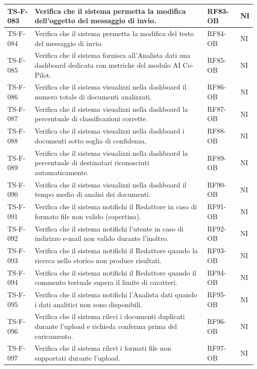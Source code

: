 \documentclass[a4paper,12pt]{article}
\begin{document}
\begin{longtable}{|p{2.2cm}|p{9.5cm}|p{2.3cm}|p{1.5cm}|}
    TS-F-083 & Verifica che il sistema permetta la modifica dell'oggetto del messaggio di invio. & RF83-OB & NI \\
    \hline
    TS-F-084 & Verifica che il sistema permetta la modifica del testo del messaggio di invio. & RF84-OB & NI \\
    \hline
    TS-F-085 & Verifica che il sistema fornisca all'Analista dati una dashboard dedicata con metriche del modulo AI Co-Pilot. & RF85-OB & NI \\
    \hline
    TS-F-086 & Verifica che il sistema visualizzi nella dashboard il numero totale di documenti analizzati. & RF86-OB & NI \\
    \hline
    TS-F-087 & Verifica che il sistema visualizzi nella dashboard la percentuale di classificazioni corrette. & RF87-OB & NI \\
    \hline
    TS-F-088 & Verifica che il sistema visualizzi nella dashboard i documenti sotto soglia di confidenza. & RF88-OB & NI \\
    \hline
    TS-F-089 & Verifica che il sistema visualizzi nella dashboard la percentuale di destinatari riconosciuti automaticamente. & RF89-OB & NI \\
    \hline
    TS-F-090 & Verifica che il sistema visualizzi nella dashboard il tempo medio di analisi dei documenti. & RF90-OB & NI \\
    \hline
    TS-F-091 & Verifica che il sistema notifichi il Redattore in caso di formato file non valido (copertina). & RF91-OB & NI \\
    \hline
    TS-F-092 & Verifica che il sistema notifichi l'utente in caso di indirizzo e-mail non valido durante l'inoltro. & RF92-OB & NI \\
    \hline
    TS-F-093 & Verifica che il sistema notifichi il Redattore quando la ricerca nello storico non produce risultati. & RF93-OB & NI \\
    \hline
    TS-F-094 & Verifica che il sistema notifichi il Redattore quando il commento testuale supera il limite di caratteri. & RF94-OB & NI \\
    \hline
    TS-F-095 & Verifica che il sistema notifichi l'Analista dati quando i dati analitici non sono disponibili. & RF95-OB & NI \\
    \hline
    TS-F-096 & Verifica che il sistema rilevi i documenti duplicati durante l'upload e richieda conferma prima del caricamento. & RF96-OB & NI \\
    \hline
    TS-F-097 & Verifica che il sistema rilevi i formati file non supportati durante l'upload. & RF97-OB & NI \\

\end{longtable}
\end{document}
